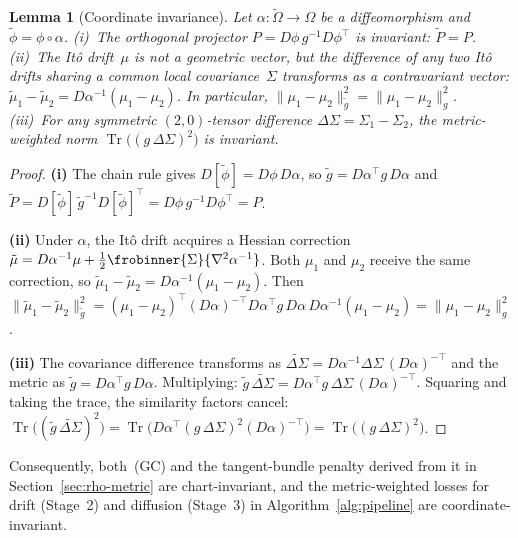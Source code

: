\documentclass[11pt]{article}
\newcommand{\Om}{\Omega}
\newcommand{\tr}{\operatorname{Tr}}
\newcommand{\norm}[1]{\lVert#1\rVert}
\newtheorem{lem}[thm]{Lemma}
\begin{document}
\begin{lem}[Coordinate invariance]\label{lem:coord-invariance}
  Let $\alpha:\tilde{\Om}\to\Om$ be a diffeomorphism and
  $\tilde\phi = \phi\circ\alpha$.
  \textup{(i)}~The orthogonal projector
  $P=D\phi\,g^{-1}D\phi^\top$ is invariant:
  $\tilde P = P$.
  \textup{(ii)}~The It\^o drift~$\mu$ is not a geometric vector,
  but the difference of any two It\^o drifts sharing a common
  local covariance~$\Sigma$ transforms as a contravariant vector:
  $\tilde\mu_1 - \tilde\mu_2 = D\alpha^{-1}(\mu_1-\mu_2)$.
  In particular,
  $\norm{\mu_1-\mu_2}_{\tilde g}^2
  = \norm{\mu_1-\mu_2}_g^2$.
  \textup{(iii)}~For any symmetric $(2{,}0)$-tensor difference
  $\Delta\Sigma = \Sigma_1 - \Sigma_2$,
  the metric-weighted norm
  $\tr\bigl((g\,\Delta\Sigma)^2\bigr)$ is invariant.
\end{lem}

\begin{proof}
  \textbf{(i)}
  The chain rule gives
  $D[\tilde{\phi}]=D\phi\,D\alpha$, so
  $\tilde{g}=D\alpha^\top g\,D\alpha$ and
  $\tilde{P}
  =D[\tilde{\phi}]\,\tilde{g}^{-1}D[\tilde{\phi}]^\top
  =D\phi\,g^{-1}D\phi^\top=P$.

  \textbf{(ii)}
  Under $\alpha$, the It\^o drift acquires a Hessian correction
  $\tilde\mu = D\alpha^{-1}\mu
  + \tfrac{1}{2}\frobinner{\Sigma}{\nabla^2\alpha^{-1}}$.
  Both $\mu_1$ and $\mu_2$ receive the same correction, so
  $\tilde\mu_1-\tilde\mu_2 = D\alpha^{-1}(\mu_1-\mu_2)$.
  Then
  $\norm{\tilde\mu_1-\tilde\mu_2}_{\tilde g}^2
  = (\mu_1{-}\mu_2)^\top (D\alpha)^{-\top}D\alpha^\top g\,D\alpha\,D\alpha^{-1}(\mu_1{-}\mu_2)
  = \norm{\mu_1-\mu_2}_g^2$.

  \textbf{(iii)}
  The covariance difference transforms as
  $\widetilde{\Delta\Sigma} = D\alpha^{-1}\Delta\Sigma\,(D\alpha)^{-\top}$
  and the metric as $\tilde g = D\alpha^\top g\,D\alpha$.
  Multiplying:
  $\tilde g\,\widetilde{\Delta\Sigma}
  = D\alpha^\top g\,\Delta\Sigma\,(D\alpha)^{-\top}$.
  Squaring and taking the trace, the similarity factors cancel:
  $\tr\bigl((\tilde g\,\widetilde{\Delta\Sigma})^2\bigr)
  = \tr\bigl(D\alpha^\top(g\,\Delta\Sigma)^2 (D\alpha)^{-\top}\bigr)
  = \tr\bigl((g\,\Delta\Sigma)^2\bigr)$.
\end{proof}

Consequently, both~(GC) and the tangent-bundle penalty derived from
it in Section~\ref{sec:rho-metric} are chart-invariant, and the
metric-weighted losses for drift (Stage~2) and diffusion (Stage~3)
in Algorithm~\ref{alg:pipeline} are coordinate-invariant.
\end{document}
